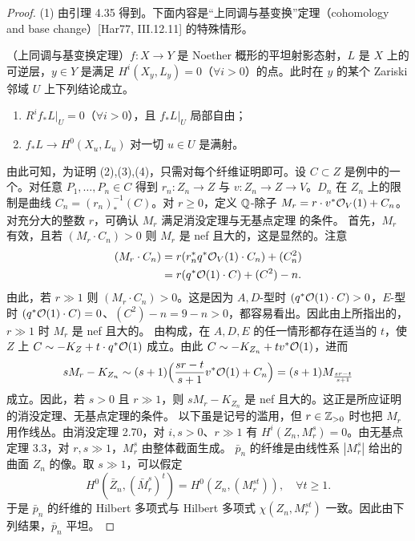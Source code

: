 \begin{proof}
(1) 由引理 4.35 得到。下面内容是“上同调与基变换”定理（cohomology and base change）[Har77, III.12.11] 的特殊情形。

\par\smallskip\noindent\hspace*{2em}（上同调与基变换定理）$f\colon X\to Y$ 是 Noether 概形的平坦射影态射，$L$ 是 $X$ 上的可逆层，$y\in Y$ 是满足 $H^i(X_y,L_y)=0$（$\forall i>0$）的点。此时在 $y$ 的某个 Zariski 邻域 $U$ 上下列结论成立。
\begin{enumerate}[label=(\arabic*),leftmargin=2em]
\item $R^if_*L|_U=0$（$\forall i>0$），且 $f_*L|_U$ 局部自由；
\item $f_*L\to H^0(X_u,L_u)$ 对一切 $u\in U$ 是满射。
\end{enumerate}

由此可知，为证明 (2),(3),(4)，只需对每个纤维证明即可。设 $C\subset Z$ 是例中的一个。对任意 $P_1,\dots,P_n\in C$ 得到 $r_n\colon Z_n\to Z$ 与 $v\colon Z_n\to Z\to V$。$D_n$ 在 $Z_n$ 上的限制是曲线 $C_n=(r_n)_*^{-1}(C)$。对 $r\ge 0$，定义 $\mathbb{Q}$-除子 $M_r=r\cdot v^*\mathcal{O}_V(1)+C_n$。对充分大的整数 $r$，可确认 $M_r$ 满足消没定理与无基点定理
的条件。
首先，$M_r$ 有效，且若 $(M_r\cdot C_n)>0$ 则 $M_r$ 是 nef 且大的，这是显然的。注意
\[
\begin{aligned}
(M_r\cdot C_n)&=r(r_n^*q^*\mathcal{O}_V(1)\cdot C_n)+(C_n^2)\\
&=r(q^*\mathcal{O}(1)\cdot C)+(C^2)-n .
\end{aligned}
\]
由此，若 $r\gg 1$ 则 $(M_r\cdot C_n)>0$。这是因为 $A,D$-型时 $(q^*\mathcal{O}(1)\cdot C)>0$，$E$-型时 $(q^*\mathcal{O}(1)\cdot C)=0$、$(C^2)-n=9-n>0$，都容易看出。因此由上所指出的，$r\gg 1$ 时 $M_r$ 是 nef 且大的。
由构成，在 $A,D,E$ 的任一情形都存在适当的 $t$，使 $Z$ 上 $C\sim-K_Z+t\cdot q^*\mathcal{O}(1)$ 成立。由此 $C\sim-K_{Z_n}+tv^*\mathcal{O}(1)$，进而
\[
sM_r-K_{Z_n}\sim(s+1)\Bigl(\frac{sr-t}{s+1}v^*\mathcal{O}(1)+C_n\Bigr)=(s+1)M_{\frac{sr-t}{s+1}}
\]
成立。因此，若 $s>0$ 且 $r\gg 1$，则 $sM_r-K_{Z_n}$ 是 nef 且大的。这正是所应证明的消没定理、无基点定理的条件。
以下虽是记号的滥用，但 $r\in\mathbb{Z}_{>0}$ 时也把 $M_r$ 用作线丛。由消没定理 2.70，对 $i,s>0$、$r\gg 1$ 有 $H^i(Z_n,M_r^s)=0$。由无基点定理 3.3，对 $r,s\gg 1$，$M_r^s$ 由整体截面生成。
$\bar p_n$ 的纤维是由线性系 $|M_r^s|$ 给出的曲面 $Z_n$ 的像。取 $s\gg 1$，可以假定
\[
H^0(\bar Z_n,(\bar M_r^s)^t)=H^0(Z_n,(M_r^{st})),\quad \forall t\ge 1 .
\]
于是 $\bar p_n$ 的纤维的 Hilbert 多项式与 Hilbert 多项式 $\chi(Z_n,M_r^{st})$ 一致。因此由下列结果，$\bar p_n$ 平坦。


\end{proof}
